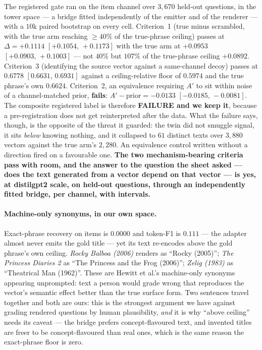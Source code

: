 \documentclass[11pt]{article}
\begin{document}
The registered gate ran on the item channel over $3{,}670$ held-out questions, in the tower space ---
a bridge fitted independently of the emitter and of the renderer --- with a $10$k paired bootstrap on
every cell. Criterion~1 (true minus scrambled, with the true arm reaching $\ge40\%$ of the
true-phrase ceiling) passes at $\Delta = \mathbf{+0.1114}$ $[+0.1054,\,+0.1173]$ with the true arm at
$+0.0953$ $[+0.0903,\,+0.1003]$ --- not $40\%$ but $107\%$ of the true-phrase ceiling $+0.0892$.
Criterion~3 (identifying the source vector against a same-channel decoy) passes at
$\mathbf{0.6778}$ $[0.6631,\,0.6931]$ against a ceiling-relative floor of $0.5974$ and the true
phrase's own $0.6624$. Criterion~2, an equivalence requiring $A'$ to sit within noise of a
channel-matched prior, \textbf{fails}: $A' - \text{prior} = -0.0133$ $[-0.0185,\,-0.0081]$. The
composite registered label is therefore \textbf{FAILURE and we keep it}, because a pre-registration
does not get reinterpreted after the data. What the failure says, though, is the opposite of the
threat it guarded: the twin did not smuggle signal, it sits \emph{below} knowing nothing, and it
collapsed to $61$ distinct texts over $3{,}880$ vectors against the true arm's $2{,}280$. An
equivalence control written without a direction fired on a favourable one. \textbf{The two
mechanism-bearing criteria pass with room, and the answer to the question the sheet asked --- does
the text generated from a vector depend on that vector --- is yes, at distilgpt2 scale, on held-out
questions, through an independently fitted bridge, per channel, with intervals.}

\paragraph{Machine-only synonyms, in our own space.} Exact-phrase recovery on items is
$\mathbf{0.0000}$ and token-F1 is $0.111$ --- the adapter almost never emits the gold title --- yet
its text re-encodes above the gold phrase's own ceiling. \emph{Rocky Balboa (2006)} renders as
``Rocky (2005)''; \emph{The Princess Diaries 2} as ``The Princess and the Frog (2006)'';
\emph{Zelig (1983)} as ``Theatrical Man (1962)''. These are Hewitt et al.'s machine-only
synonyms~\cite{hewitt2025neologism} appearing unprompted: text a person would grade wrong that
reproduces the vector's semantic effect better than the true surface form. Two sentences travel
together and both are ours: this is the strongest argument we have against grading rendered
questions by human plausibility, \emph{and} it is why ``above ceiling'' needs its caveat --- the
bridge prefers concept-flavoured text, and invented titles are freer to be concept-flavoured than
real ones, which is the same reason the exact-phrase floor is zero.
\end{document}
